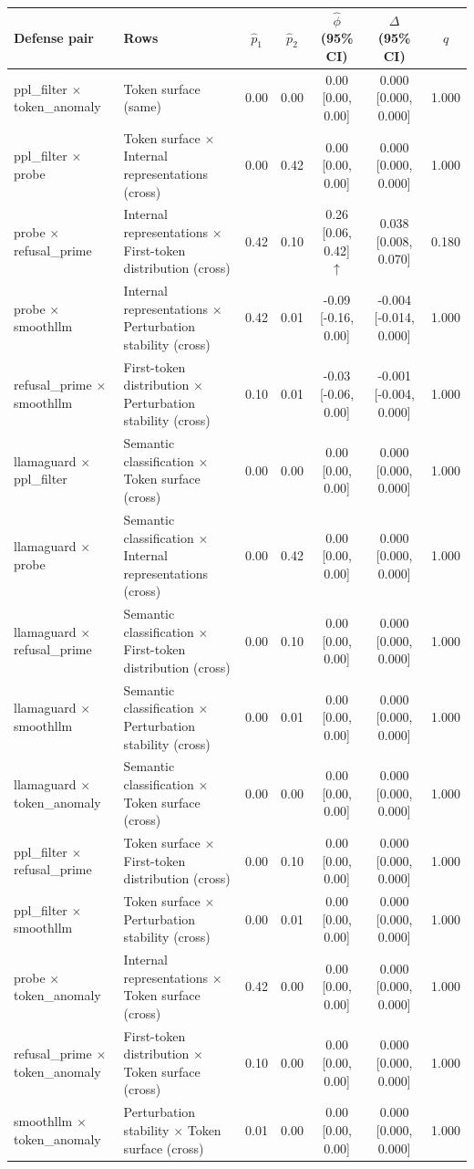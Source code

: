 \begin{tabular}{llccccc}
\toprule
Defense pair & Rows & $\hat p_1$ & $\hat p_2$ & $\hat\phi$ (95\% CI) & $\Delta$ (95\% CI) & $q$ \\
\midrule
ppl_filter $\times$ token_anomaly & Token surface (same) & 0.00 & 0.00 & 0.00 [0.00, 0.00]  & 0.000 [0.000, 0.000] & 1.000 \\
ppl_filter $\times$ probe & Token surface $\times$ Internal representations (cross) & 0.00 & 0.42 & 0.00 [0.00, 0.00]  & 0.000 [0.000, 0.000] & 1.000 \\
probe $\times$ refusal_prime & Internal representations $\times$ First-token distribution (cross) & 0.42 & 0.10 & 0.26 [0.06, 0.42] $\uparrow$ & 0.038 [0.008, 0.070] & 0.180 \\
probe $\times$ smoothllm & Internal representations $\times$ Perturbation stability (cross) & 0.42 & 0.01 & -0.09 [-0.16, 0.00]  & -0.004 [-0.014, 0.000] & 1.000 \\
refusal_prime $\times$ smoothllm & First-token distribution $\times$ Perturbation stability (cross) & 0.10 & 0.01 & -0.03 [-0.06, 0.00]  & -0.001 [-0.004, 0.000] & 1.000 \\
llamaguard $\times$ ppl_filter & Semantic classification $\times$ Token surface (cross) & 0.00 & 0.00 & 0.00 [0.00, 0.00]  & 0.000 [0.000, 0.000] & 1.000 \\
llamaguard $\times$ probe & Semantic classification $\times$ Internal representations (cross) & 0.00 & 0.42 & 0.00 [0.00, 0.00]  & 0.000 [0.000, 0.000] & 1.000 \\
llamaguard $\times$ refusal_prime & Semantic classification $\times$ First-token distribution (cross) & 0.00 & 0.10 & 0.00 [0.00, 0.00]  & 0.000 [0.000, 0.000] & 1.000 \\
llamaguard $\times$ smoothllm & Semantic classification $\times$ Perturbation stability (cross) & 0.00 & 0.01 & 0.00 [0.00, 0.00]  & 0.000 [0.000, 0.000] & 1.000 \\
llamaguard $\times$ token_anomaly & Semantic classification $\times$ Token surface (cross) & 0.00 & 0.00 & 0.00 [0.00, 0.00]  & 0.000 [0.000, 0.000] & 1.000 \\
ppl_filter $\times$ refusal_prime & Token surface $\times$ First-token distribution (cross) & 0.00 & 0.10 & 0.00 [0.00, 0.00]  & 0.000 [0.000, 0.000] & 1.000 \\
ppl_filter $\times$ smoothllm & Token surface $\times$ Perturbation stability (cross) & 0.00 & 0.01 & 0.00 [0.00, 0.00]  & 0.000 [0.000, 0.000] & 1.000 \\
probe $\times$ token_anomaly & Internal representations $\times$ Token surface (cross) & 0.42 & 0.00 & 0.00 [0.00, 0.00]  & 0.000 [0.000, 0.000] & 1.000 \\
refusal_prime $\times$ token_anomaly & First-token distribution $\times$ Token surface (cross) & 0.10 & 0.00 & 0.00 [0.00, 0.00]  & 0.000 [0.000, 0.000] & 1.000 \\
smoothllm $\times$ token_anomaly & Perturbation stability $\times$ Token surface (cross) & 0.01 & 0.00 & 0.00 [0.00, 0.00]  & 0.000 [0.000, 0.000] & 1.000 \\
\bottomrule
\end{tabular}